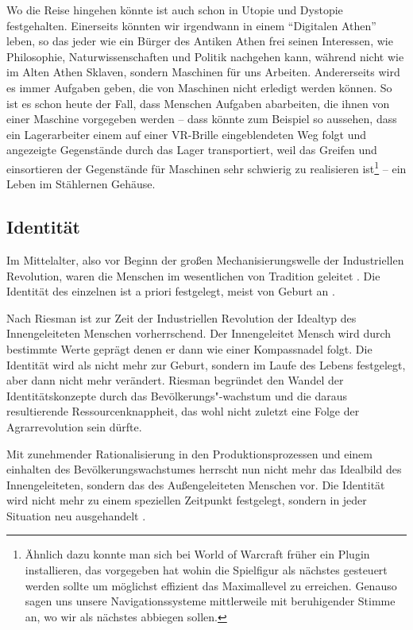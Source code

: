 Wo die Reise hingehen könnte ist auch schon in Utopie und Dystopie festgehalten.
Einerseits könnten wir irgendwann in einem \enquote{Digitalen Athen} leben, so das jeder wie ein Bürger des Antiken Athen frei seinen Interessen, wie Philosophie, Naturwissenschaften und Politik nachgehen kann, während nicht wie im Alten Athen Sklaven, sondern Maschinen für uns Arbeiten.
Andererseits wird es immer Aufgaben geben, die von Maschinen nicht erledigt werden können.
So ist es schon heute der Fall, dass Menschen Aufgaben abarbeiten, die ihnen von einer Maschine vorgegeben werden – dass könnte zum Beispiel so aussehen, dass ein Lagerarbeiter einem auf einer VR-Brille eingeblendeten Weg folgt und angezeigte Gegenstände durch das Lager transportiert, weil das Greifen und einsortieren der Gegenstände für Maschinen sehr schwierig zu realisieren ist\footnote{Ähnlich dazu konnte man sich bei World of Warcraft früher ein Plugin installieren, das vorgegeben hat wohin die Spielfigur als nächstes gesteuert werden sollte um möglichst effizient das Maximallevel zu erreichen. Genauso sagen uns unsere Navigationssysteme mittlerweile mit beruhigender Stimme an, wo wir als nächstes abbiegen sollen.} – ein Leben im Stählernen Gehäuse.

\subsection{Identität}

Im Mittelalter, also vor Beginn der großen Mechanisierungswelle der Industriellen Revolution, waren die Menschen im wesentlichen von Tradition geleitet \parencite{riessman}.
Die Identität des einzelnen ist a priori festgelegt, meist von Geburt an \parencite{rosa}.

Nach Riesman ist zur Zeit der Industriellen Revolution der Idealtyp des Innengeleiteten Menschen vorherrschend. Der Innengeleitet Mensch wird durch bestimmte Werte geprägt denen er dann wie einer Kompassnadel folgt.
Die Identität wird als nicht mehr zur Geburt, sondern im Laufe des Lebens festgelegt, aber dann nicht mehr verändert.
Riesman begründet den Wandel der Identitätskonzepte durch das Bevölkerungs"-wachstum und die daraus resultierende Ressourcenknappheit, das wohl nicht zuletzt eine Folge der Agrarrevolution sein dürfte.

Mit zunehmender Rationalisierung in den Produktionsprozessen und einem einhalten des Bevölkerungswachstumes herrscht nun nicht mehr das Idealbild des Innengeleiteten, sondern das des Außengeleiteten Menschen vor.
Die Identität wird nicht mehr zu einem speziellen Zeitpunkt festgelegt, sondern in jeder Situation neu ausgehandelt \parencite{rosa}.
